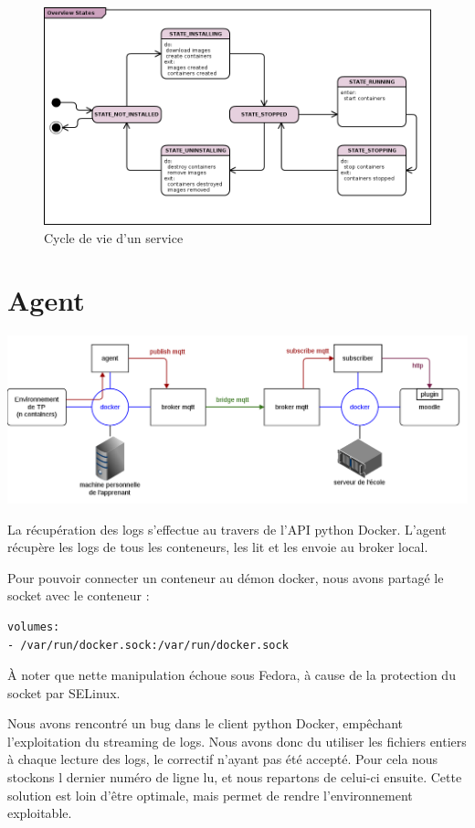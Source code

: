 \documentclass[a4paper,11pt]{report}
\begin{document}
\begin{figure}[h]
   \caption{\label{overview-states} Cycle de vie d'un service}
   \centering
   \includegraphics[width=\textwidth, keepaspectratio=true]{overview-states.png}
\end{figure}

\section{Agent}

\includegraphics[scale=0.37]{docker}

La récupération des logs s'effectue au travers de l'API python Docker\cite{docker-py}.
L'agent récupère les logs de tous les conteneurs, les lit et les envoie au broker local.

Pour pouvoir connecter un conteneur au démon docker, nous avons partagé le socket avec le conteneur :

\begin{lstlisting}[language=Bash,caption={Extrait de la configuration fig}]
volumes:
- /var/run/docker.sock:/var/run/docker.sock
\end{lstlisting}

À noter que nette manipulation échoue sous Fedora, à cause de la protection du socket par SELinux.

Nous avons rencontré un bug\cite{dockerpybug} dans le client python Docker, empêchant l'exploitation du streaming de logs. Nous avons donc du utiliser les fichiers entiers à chaque lecture des logs, le correctif n'ayant pas été accepté. Pour cela nous stockons l dernier numéro de ligne lu, et nous repartons de celui-ci ensuite. Cette solution est loin d'être optimale, mais permet de rendre l'environnement exploitable.
\end{document}
